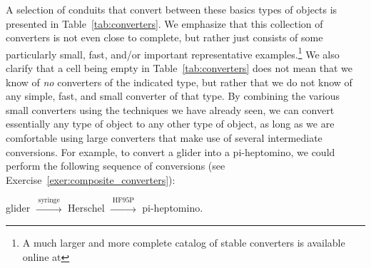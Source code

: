 A selection of conduits that convert between these basics types of objects is presented in Table~\ref{tab:converters}. We emphasize that this collection of converters is not even close to complete, but rather just consists of some particularly small, fast, and/or important representative examples.\footnote{A much larger and more complete catalog of stable converters is available online at } We also clarify that a cell being empty in Table~\ref{tab:converters} does not mean that we know of \emph{no} converters of the indicated type, but rather that we do not know of any simple, fast, and small converter of that type. By combining the various small converters using the techniques we have already seen, we can convert essentially any type of object to any other type of object, as long as we are comfortable using large converters that make use of several intermediate conversions. For example, to convert a glider into a pi-heptomino, we could perform the following sequence of conversions (see Exercise~\ref{exer:composite_converters}):

\begin{center}
	glider $\xrightarrow{{}_{} \ \text{syringe} \ {}_{}}$ Herschel $\xrightarrow{{}_{} \ \text{HF95P} \ {}_{}}$ pi-heptomino.
\end{center}

